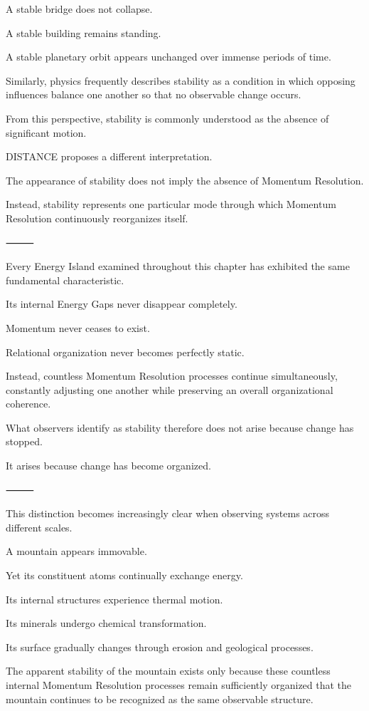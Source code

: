 A stable bridge does not collapse.

A stable building remains standing.

A stable planetary orbit appears unchanged over immense periods of time.

Similarly, physics frequently describes stability as a condition in which opposing influences balance one another so that no observable change occurs.

From this perspective, stability is commonly understood as the absence of significant motion.

DISTANCE proposes a different interpretation.

The appearance of stability does not imply the absence of Momentum Resolution.

Instead, stability represents one particular mode through which Momentum Resolution continuously reorganizes itself.

⸻

Every Energy Island examined throughout this chapter has exhibited the same fundamental characteristic.

Its internal Energy Gaps never disappear completely.

Momentum never ceases to exist.

Relational organization never becomes perfectly static.

Instead, countless Momentum Resolution processes continue simultaneously, constantly adjusting one another while preserving an overall organizational coherence.

What observers identify as stability therefore does not arise because change has stopped.

It arises because change has become organized.

⸻

This distinction becomes increasingly clear when observing systems across different scales.

A mountain appears immovable.

Yet its constituent atoms continually exchange energy.

Its internal structures experience thermal motion.

Its minerals undergo chemical transformation.

Its surface gradually changes through erosion and geological processes.

The apparent stability of the mountain exists only because these countless internal Momentum Resolution processes remain sufficiently organized that the mountain continues to be recognized as the same observable structure.

